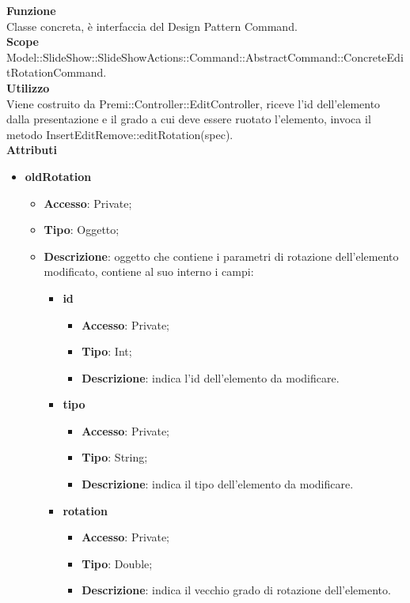 {{{		\label{EditRotationCommand}
		\textbf{Funzione}\\
			\indent Classe concreta, è interfaccia del Design Pattern Command.\\
	   	\textbf{Scope}\\
			\indent Model::SlideShow::SlideShowActions::Command::AbstractCommand::\-ConcreteEditRotationCommand.\\
		\textbf{Utilizzo}\\
			\indent Viene costruito da Premi::Controller::EditController, riceve l’id dell’elemento dalla presentazione e il grado a cui deve essere ruotato l’elemento, invoca il metodo InsertEditRemove::editRotation(spec).\\
		\textbf{Attributi}
		\begin{itemize}
			\item \textbf{oldRotation}
			\begin{itemize}
			\item \textbf{Accesso}: Private;
			\item \textbf{Tipo}: Oggetto;
			\item \textbf{Descrizione}: oggetto che contiene i parametri di rotazione dell'elemento modificato, contiene al suo interno i campi:
			\begin{itemize}
			\item \textbf{id}
			\begin{itemize}
				\item \textbf{Accesso}: Private;
				\item \textbf{Tipo}: Int;
				\item \textbf{Descrizione}: indica l'id dell’elemento da modificare.
			\end{itemize}
			\item \textbf{tipo}
			\begin{itemize}
				\item \textbf{Accesso}: Private;
				\item \textbf{Tipo}: String;
				\item \textbf{Descrizione}: indica il tipo dell’elemento da modificare.
			\end{itemize}
			\item \textbf{rotation}
			\begin{itemize}
				\item \textbf{Accesso}: Private;
				\item \textbf{Tipo}: Double;
				\item \textbf{Descrizione}: indica il vecchio grado di rotazione dell’elemento.

\end{itemize}
\end{itemize}
\end{itemize}
\end{itemize}}}}
